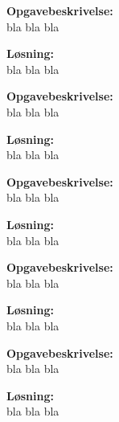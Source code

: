 \documentclass{article}
\begin{document}
\begin{assignment}[Opgave 4.15]
  \begin{description}
    \textbf{Opgavebeskrivelse:}\\
    bla bla bla
  \end{description}
  \begin{solution}
    \textbf{Løsning:}\\
    bla bla bla
  \end{solution}
\end{assignment}


\begin{assignment}[Opgave 5.2]
  \begin{description}
    \textbf{Opgavebeskrivelse:}\\
    bla bla bla
  \end{description}
  \begin{solution}
    \textbf{Løsning:}\\
    bla bla bla
  \end{solution}
\end{assignment}


\begin{assignment}[Opgave 5.3]
  \begin{description}
    \textbf{Opgavebeskrivelse:}\\
    bla bla bla
  \end{description}
  \begin{solution}
    \textbf{Løsning:}\\
    bla bla bla
  \end{solution}
\end{assignment}


\begin{assignment}[Opgave 5.4]
  \begin{description}
    \textbf{Opgavebeskrivelse:}\\
    bla bla bla
  \end{description}
  \begin{solution}
    \textbf{Løsning:}\\
    bla bla bla
  \end{solution}
\end{assignment}


\begin{assignment}[Opgave 5.5]
  \begin{description}
    \textbf{Opgavebeskrivelse:}\\
    bla bla bla
  \end{description}
  \begin{solution}
    \textbf{Løsning:}\\
    bla bla bla
  \end{solution}
\end{assignment}
\end{document}
